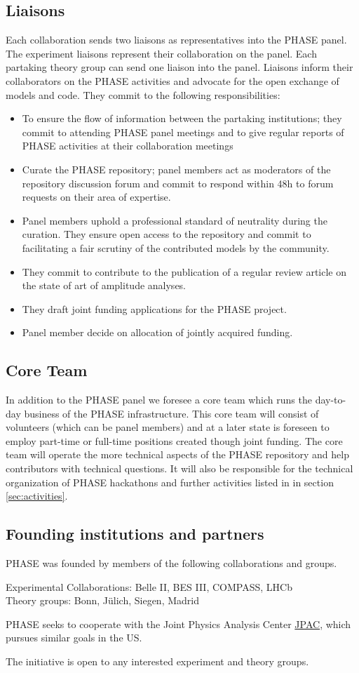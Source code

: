 \subsection{Liaisons}
Each collaboration sends two liaisons as representatives into the PHASE panel. The experiment liaisons represent their collaboration on the panel. Each partaking theory group can send one liaison into the panel. Liaisons inform their collaborators on the PHASE activities and advocate for the open exchange of models and code. They commit to the following responsibilities:
\begin{itemize}
\item To ensure the flow of information between the partaking institutions; they commit to attending PHASE panel meetings and to give regular reports of PHASE activities at their collaboration meetings
\item Curate the PHASE repository; panel members act as moderators of the repository discussion forum and commit to respond within 48h to forum requests on their area of expertise. 
\item Panel members uphold a professional standard of neutrality during the curation. They ensure open access to the repository and commit to facilitating a fair scrutiny of the contributed models by the community. 
\item They commit to contribute to the publication of a regular review article on the state of art of amplitude analyses.
\item They draft joint funding applications for the PHASE project.
\item Panel member decide on allocation of jointly acquired funding.
\end{itemize}

\subsection{Core Team}
In addition to the PHASE panel we foresee a core team which runs the day-to-day business of the PHASE infrastructure. This core team will consist of volunteers (which can be panel members) and at a later state is foreseen to employ part-time or full-time positions created though joint funding. The core team will operate the more technical aspects of the PHASE repository and help contributors with technical questions. It will also be responsible for the technical organization of PHASE hackathons and further activities listed in in section \ref{sec:activities}.

\subsection{Founding institutions and partners}
PHASE was founded by members of the following collaborations and groups.

Experimental Collaborations: Belle II, BES III, COMPASS, LHCb \\
Theory groups: Bonn, J\"ulich, Siegen, Madrid

PHASE seeks to cooperate with the Joint Physics Analysis Center \href{https://jpac.jlab.org/}{JPAC}, which pursues similar goals in the US.

The initiative is open to any interested experiment and theory groups.